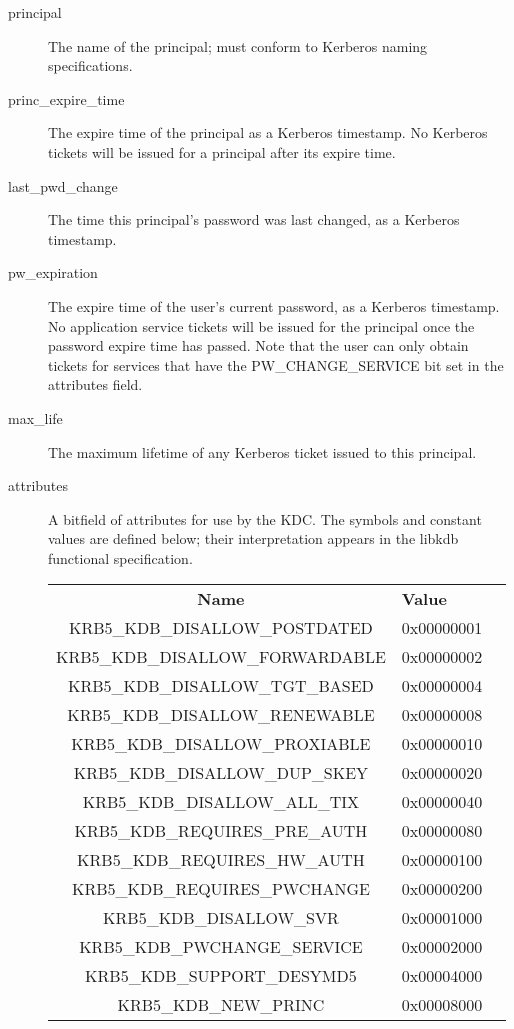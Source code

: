 \begin{description}
\item[principal] The name of the principal; must conform to Kerberos
naming specifications.

\item[princ_expire_time] The expire time of the principal as a Kerberos
timestamp.  No Kerberos tickets will be issued for a principal after
its expire time.

\item[last_pwd_change] The time this principal's password was last
changed, as a Kerberos timestamp.

\item[pw_expiration] The expire time of the user's current password, as a
Kerberos timestamp.  No application service tickets will be issued for the
principal once the password expire time has passed.  Note that the user can
only obtain tickets for services that have the PW_CHANGE_SERVICE bit set in
the attributes field.

\item[max_life] The maximum lifetime of any Kerberos ticket issued to
this principal.

\item[attributes] A bitfield of attributes for use by the KDC.  The
symbols and constant values are defined below; their interpretation
appears in the libkdb functional specification.

\begin{tabular}{clr}
{\bf Name} & {\bf Value} \\
KRB5_KDB_DISALLOW_POSTDATED     & 0x00000001 \\
KRB5_KDB_DISALLOW_FORWARDABLE   & 0x00000002 \\
KRB5_KDB_DISALLOW_TGT_BASED     & 0x00000004 \\
KRB5_KDB_DISALLOW_RENEWABLE     & 0x00000008 \\
KRB5_KDB_DISALLOW_PROXIABLE     & 0x00000010 \\
KRB5_KDB_DISALLOW_DUP_SKEY      & 0x00000020 \\
KRB5_KDB_DISALLOW_ALL_TIX       & 0x00000040 \\
KRB5_KDB_REQUIRES_PRE_AUTH      & 0x00000080 \\
KRB5_KDB_REQUIRES_HW_AUTH       & 0x00000100 \\
KRB5_KDB_REQUIRES_PWCHANGE      & 0x00000200 \\
KRB5_KDB_DISALLOW_SVR           & 0x00001000 \\
KRB5_KDB_PWCHANGE_SERVICE       & 0x00002000 \\
KRB5_KDB_SUPPORT_DESYMD5         & 0x00004000 \\
KRB5_KDB_NEW_PRINC              & 0x00008000
\end{tabular}


\end{description}
